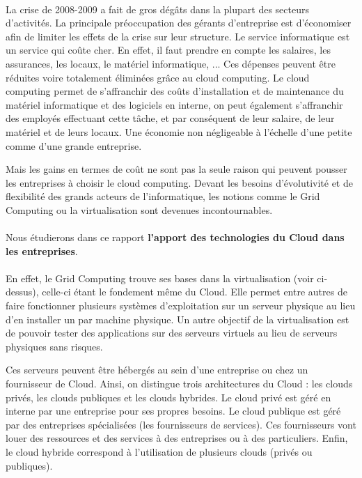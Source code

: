 \documentclass[a4paper,12pt]{report}
\begin{document}
\begin{onehalfspace}
	\paragraph*{}
	La crise de 2008-2009 a fait de gros dégâts dans la plupart des secteurs d’activités. La principale préoccupation des gérants d’entreprise est d’économiser afin de limiter les effets de la crise sur leur structure. Le service informatique est un service qui coûte cher. En effet, il faut prendre en compte les salaires, les assurances, les locaux, le matériel informatique, ... Ces dépenses peuvent être réduites voire totalement éliminées grâce au cloud computing. Le cloud computing permet de s'affranchir des coûts d'installation et de maintenance du matériel informatique et des logiciels en interne, on peut également s'affranchir des employés effectuant cette tâche, et par conséquent de leur salaire, de leur matériel et de leurs locaux. Une économie non négligeable à l'échelle d'une petite comme d'une grande entreprise.

	Mais les gains en termes de coût ne sont pas la seule raison qui peuvent pousser les entreprises à choisir le cloud computing. Devant les besoins d'évolutivité et de flexibilité des grands acteurs de l'informatique, les notions comme le Grid Computing ou la virtualisation sont devenues incontournables.
	
	\paragraph*{}
	Nous étudierons dans ce rapport \textbf{l’apport des technologies du Cloud dans les entreprises}.
	
	\paragraph*{}
	En effet, le Grid Computing trouve ses bases dans la virtualisation (voir ci-dessus), celle-ci étant  le fondement même du Cloud. Elle permet entre autres de faire fonctionner plusieurs systèmes d’exploitation sur un serveur physique au lieu d’en installer un par machine physique. Un autre objectif de la virtualisation est de pouvoir tester des applications sur des serveurs virtuels au lieu de serveurs physiques sans risques.
	
	Ces serveurs peuvent être hébergés au sein d’une entreprise ou chez un fournisseur de Cloud. Ainsi, on distingue trois architectures du Cloud : les clouds privés, les clouds publiques et les clouds hybrides. Le cloud privé est géré en interne par une entreprise pour ses propres besoins. Le cloud publique est géré par des entreprises spécialisées (les fournisseurs de services). Ces fournisseurs vont louer des ressources et des services à des entreprises ou à des particuliers. Enfin, le cloud hybride correspond à l’utilisation de plusieurs clouds (privés ou publiques).
	

\end{onehalfspace}
\end{document}
